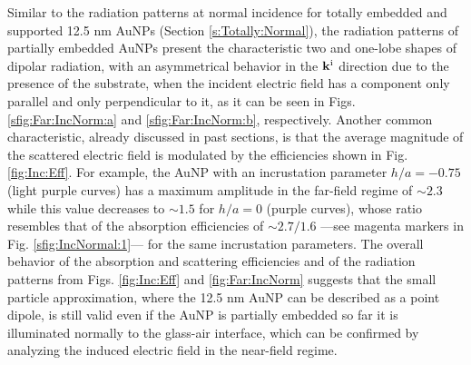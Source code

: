 Similar to the radiation patterns at normal incidence for totally embedded and supported 12.5 nm AuNPs (Section \ref{s:Totally:Normal}), the radiation patterns of partially embedded AuNPs present the characteristic two and one-lobe shapes of dipolar radiation, with an asymmetrical behavior in the $\vb{k}^\text{i}$ direction due to the presence of the substrate, when  the incident electric field has a component only parallel and only perpendicular to it, as it can be seen in Figs. \ref{sfig:Far:IncNorm:a} and \ref{sfig:Far:IncNorm:b}, respectively. Another common characteristic, already discussed in past sections, is that the average magnitude of the scattered electric field is modulated by the efficiencies shown in Fig. \ref{fig:Inc:Eff}. For example, the AuNP with an incrustation parameter $h/a = -0.75$ (light purple curves) has a maximum amplitude in the far-field regime of $\sim  2.3  $ while this value decreases to $\sim 1.5$ for $h/a = 0$ (purple curves), whose ratio resembles that of the absorption efficiencies of $\sim 2.7/1.6$ ---see magenta markers in Fig. \ref{sfig:IncNormal:1}--- for the same incrustation parameters. The overall behavior of the absorption and scattering efficiencies and of the radiation patterns
from Figs. \ref{fig:Inc:Eff} and \ref{fig:Far:IncNorm} suggests that the small particle approximation, where the 12.5 nm AuNP can be described as a point dipole, is still valid even if the AuNP is partially embedded so far it is illuminated normally to the glass-air interface, which can be confirmed by analyzing the induced electric field in the near-field regime.

